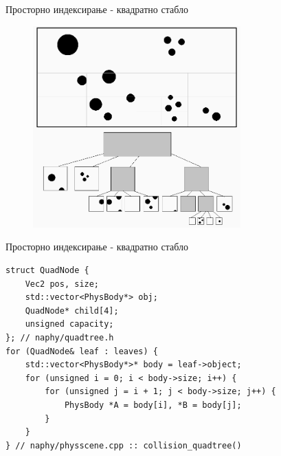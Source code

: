 \documentclass[]{beamer}
\begin{document}
\begin{frame}[fragile]{Просторно индексирање - квадратно стабло}
     \begin{figure}[htp]
        \centering
        \includegraphics[width=8cm]{img_03.png}
    \end{figure}
\end{frame}

\begin{frame}[fragile]{Просторно индексирање - квадратно стабло}
    \begin{verbatim}
struct QuadNode {
    Vec2 pos, size;
    std::vector<PhysBody*> obj;
    QuadNode* child[4];
    unsigned capacity;
}; // naphy/quadtree.h
for (QuadNode& leaf : leaves) {
    std::vector<PhysBody*>* body = leaf->object;
    for (unsigned i = 0; i < body->size; i++) {
        for (unsigned j = i + 1; j < body->size; j++) {
            PhysBody *A = body[i], *B = body[j];
        }
    }
} // naphy/physscene.cpp :: collision_quadtree()
    \end{verbatim}
\end{frame}

\end{document}
